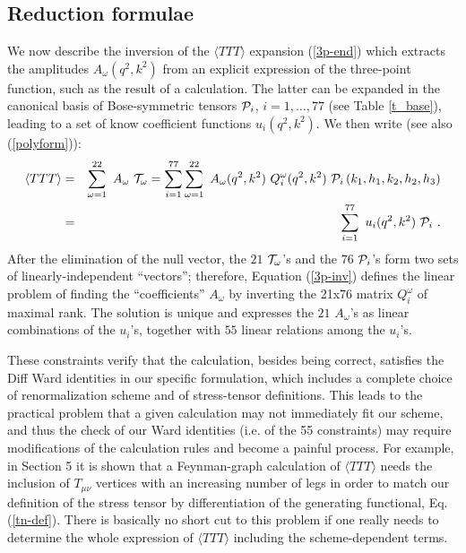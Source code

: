 \documentclass[11pt]{article}
\newcommand{\bea}{\begin{eqnarray}}
\newcommand{\eea}{\end{eqnarray}}
\def\o{\omega}
\def\nl{\nonumber\\}
\def\TTT{\bra TTT\ket}
\def\bra{\langle}
\def\ket{\rangle}
\begin{document}
 
\subsection{Reduction formulae}

We now describe the inversion of the $\TTT$ expansion
(\ref{3p-end}) which extracts the amplitudes $A_\o(q^2,k^2)$ 
from an explicit expression of the three-point function,
such as the result of a calculation.
The latter can be expanded in the canonical
basis of Bose-symmetric tensors ${\cal P}_i$, $i=1,\dots,77$
(see Table \ref{t_base}),
leading to a set of know coefficient functions $u_i(q^2,k^2)$.
We then write (see also (\ref{polyform})):
\bea
\TTT & =& \sum_{\o=1}^{22}\ A_\o \ {\cal T}_\omega = 
\sum_{i=1}^{77} \sum_{\o=1}^{22}\ A_\o(q^2,k^2) \ Q^\o_i(q^2,k^2) 
\ {\cal P}_i \left(k_1,h_1,k_2,h_2,h_3\right) \nl
&=& \sum_{i=1}^{77} \ u_i(q^2,k^2)\ {\cal P}_i \ .
\label{3p-inv}
\eea
After the elimination of the null vector,
the $21$  ${\cal T}_\o$'s and the $76$ ${\cal P}_i$'s form
two sets of linearly-independent ``vectors''; therefore,
Equation (\ref{3p-inv}) defines the linear
problem of finding the ``coefficients'' $A_\o$ by
inverting the 21x76 matrix $Q^\o_i$ of maximal rank.
The solution is unique and expresses the $21$ 
$A_\o$'s as linear combinations of the $u_i$'s, together with
$55$ linear relations among the $u_i$'s.

These constraints verify that the calculation, besides being
correct, satisfies the Diff Ward identities in our specific
formulation, which includes a complete choice of renormalization
scheme and of stress-tensor definitions.
This leads to the practical problem that a given 
calculation may not immediately fit our scheme, and thus the 
check of our Ward identities (i.e. of the 55 constraints) may 
require modifications of the calculation rules and become a 
painful process. 
For example, in Section 5 it is shown that 
a Feynman-graph calculation of $\TTT$ needs
the inclusion of $T_{\mu\nu}$ vertices with an increasing number of
legs in order to match our definition of the stress tensor by
differentiation of the generating functional, Eq.(\ref{tn-def}).
There is basically no short cut to this problem if one really
needs to determine the whole expression of $\TTT$ including 
the scheme-dependent terms.
\end{document}
